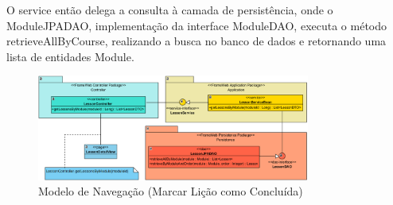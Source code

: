 O \textsf{service} então delega a consulta à camada de persistência, onde o \textsf{ModuleJPADAO}, implementação da interface \textsf{ModuleDAO}, executa o método \textsf{retrieveAllByCourse}, realizando a busca no banco de dados e retornando uma lista de entidades \textsf{Module}.

\begin{figure}[h]
	\centering
	\includegraphics[width=0.8\textwidth]{figuras/marcarLicaoConcluida.png}
	\caption{Modelo de Navegação (\textsf{Marcar Lição como Concluída})}
	\label{marcarLicaoConcluida}
\end{figure}